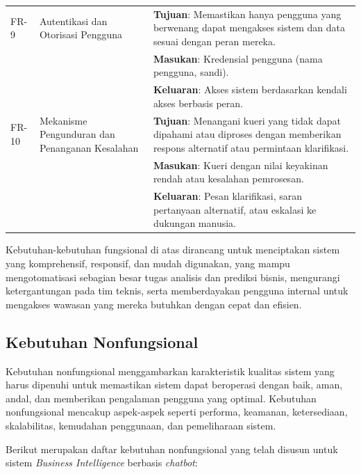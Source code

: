 \begin{longtable}{|p{1.3cm}|p{4.5cm}|p{7cm}|}
FR-9 & Autentikasi dan Otorisasi Pengguna & 
\textbf{Tujuan}: Memastikan hanya pengguna yang berwenang dapat mengakses sistem dan data sesuai dengan peran mereka. \\
& & \textbf{Masukan}: Kredensial pengguna (nama pengguna, sandi). \\
& & \textbf{Keluaran}: Akses sistem berdasarkan kendali akses berbasis peran. \\
\hline

FR-10 & Mekanisme Pengunduran dan Penanganan Kesalahan & 
\textbf{Tujuan}: Menangani kueri yang tidak dapat dipahami atau diproses dengan memberikan respons alternatif atau permintaan klarifikasi. \\
& & \textbf{Masukan}: Kueri dengan nilai keyakinan rendah atau kesalahan pemrosesan. \\
& & \textbf{Keluaran}: Pesan klarifikasi, saran pertanyaan alternatif, atau eskalasi ke dukungan manusia. \\
\hline

\end{longtable}

Kebutuhan-kebutuhan fungsional di atas dirancang untuk menciptakan sistem yang komprehensif, responsif, dan mudah digunakan, yang mampu mengotomatisasi sebagian besar tugas analisis dan prediksi bisnis, mengurangi ketergantungan pada tim teknis, serta memberdayakan pengguna internal untuk mengakses wawasan yang mereka butuhkan dengan cepat dan efisien.

\subsection{Kebutuhan Nonfungsional}

Kebutuhan nonfungsional menggambarkan karakteristik kualitas sistem yang harus dipenuhi untuk memastikan sistem dapat beroperasi dengan baik, aman, andal, dan memberikan pengalaman pengguna yang optimal. Kebutuhan nonfungsional mencakup aspek-aspek seperti performa, keamanan, ketersediaan, skalabilitas, kemudahan penggunaan, dan pemeliharaan sistem.

Berikut merupakan daftar kebutuhan nonfungsional yang telah disusun untuk sistem \textit{Business Intelligence} berbasis \textit{chatbot}:

